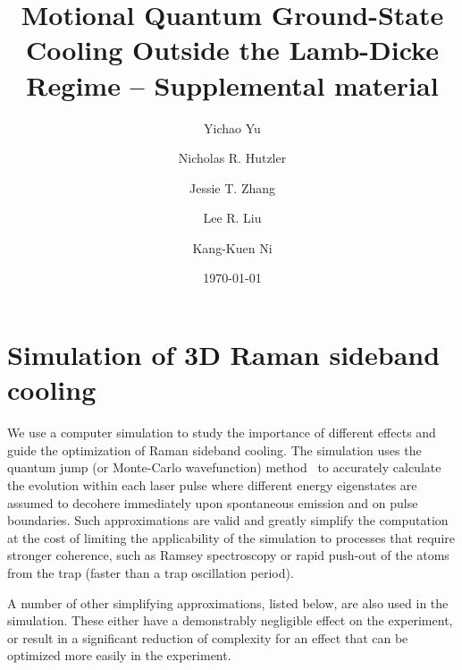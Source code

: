 \documentclass[aps,secnumarabic,amsmath,amssymb]{revtex4}
\begin{document}
\title{Motional Quantum Ground-State Cooling Outside the Lamb-Dicke Regime -- Supplemental material}
\author{Yichao Yu}
\author{Nicholas R. Hutzler}
\author{Jessie T. Zhang}
\author{Lee R. Liu}
\author{Kang-Kuen Ni}

\date{\today}

\maketitle

\section{Simulation of 3D Raman sideband cooling}

We use a computer simulation to study the importance of different effects
and guide the optimization of Raman sideband cooling.
The simulation uses the quantum jump (or Monte-Carlo wavefunction) method~\cite{Dalibard1992,Chretien2014}
to accurately calculate the evolution within each laser pulse where different energy eigenstates
are assumed to decohere immediately upon spontaneous emission and on pulse boundaries.
Such approximations are valid and greatly simplify the computation
at the cost of limiting the applicability of the simulation to processes that require stronger
coherence, such as Ramsey spectroscopy or rapid push-out of the atoms from the trap
(faster than a trap oscillation period).

A number of other simplifying approximations, listed below, are also used in the simulation.
These either have a demonstrably negligible effect on the experiment,
or result in a significant reduction of complexity for an effect
that can be optimized more easily in the experiment.
\end{document}
